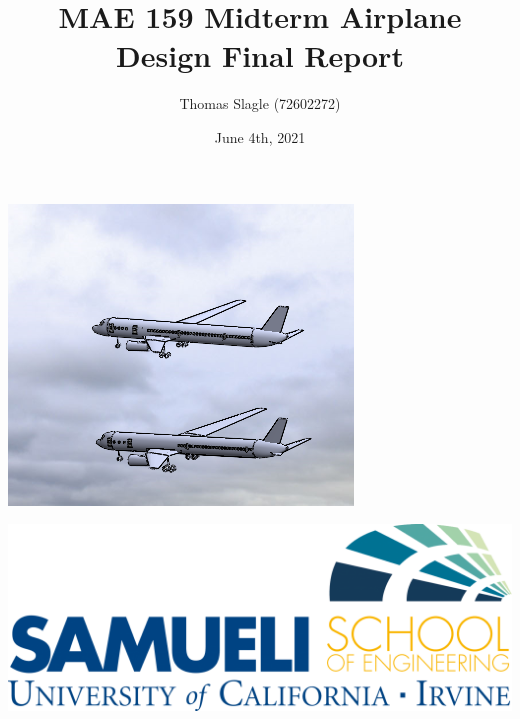 \documentclass{article}
\title{MAE 159 Midterm Airplane Design Final Report}
\author{Thomas Slagle (72602272)}
\date{June 4th, 2021}
\begin{document}
    \maketitle
    \begin{center}
        \includegraphics[scale=1.0]{Aircraft.PNG}

        \vspace{1in}

        \includegraphics[scale=0.25]{pngjoy.com_uci-logo-uc-irvine-henry-samueli-school-of_6860660.png}
    \end{center}

    \pagebreak
    \tableofcontents
    \pagebreak
\end{document}
